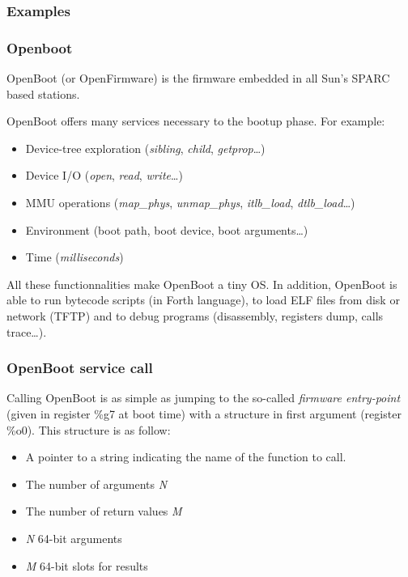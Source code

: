 \subsubsection{Examples}
\begin{frame}
  \frametitle{Openboot}

  OpenBoot (or OpenFirmware) is the firmware embedded in all Sun's
  SPARC based stations.

  \-

  OpenBoot offers many services necessary to the
  bootup phase. For example:

  \begin{itemize}
  \item
    Device-tree exploration (\emph{sibling}, \emph{child},
    \emph{getprop}\ldots)
  \item
    Device I/O (\emph{open}, \emph{read}, \emph{write}\ldots)
  \item
    MMU operations (\emph{map\_phys}, \emph{unmap\_phys}, \emph{itlb\_load},
    \emph{dtlb\_load}\ldots)
  \item
    Environment (boot path, boot device, boot arguments\ldots)
  \item
    Time (\emph{milliseconds})
  \end{itemize}

  \-

  All these functionnalities make OpenBoot a tiny OS. In addition,
  OpenBoot is able to run bytecode scripts (in Forth language), to
  load ELF files from disk or network (TFTP) and to debug programs
  (disassembly, registers dump, calls trace\ldots).

\end{frame}

\begin{frame}
  \frametitle{OpenBoot service call}

  Calling OpenBoot is as simple as jumping to the so-called
  \emph{firmware entry-point} (given in register \%g7 at boot time)
  with a structure in first argument (register \%o0). This structure is
  as follow:

  \begin{itemize}
  \item
    A pointer to a string indicating the name of the function to call.
  \item
    The number of arguments \emph{N}
  \item
    The number of return values \emph{M}
  \item
    \emph{N} 64-bit arguments
  \item
    \emph{M} 64-bit slots for results
  \end{itemize}

\end{frame}

